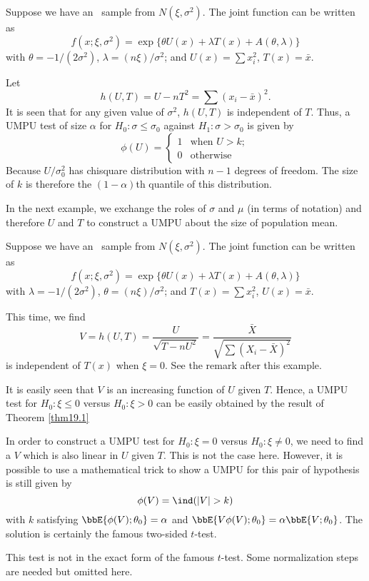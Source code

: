 \begin{example}
Suppose we have an \iid\ sample from $N(\xi, \sigma^2)$.
The joint function can be written as
\[
f(x; \xi, \sigma^2) = 
\exp\{ \theta U(x) + \lambda T(x) + A(\theta, \lambda) \}
\]
with $\theta = - 1/(2 \sigma^2)$, $\lambda = (n\xi)/\sigma^2$;
and
$U(x)  = \sum x_i^2$, $T(x) = \bar x$.

Let 
\[
h(U, T) = U - n T^2 = \sum (x_i - \bar x)^2.
\]
It is seen that for any given value of $\sigma^2$,
$h(U, T)$ is independent of $T$. 
Thus, a UMPU  test  of size $\alpha$ for $H_0: \sigma \leq \sigma_0$
against  $H_1: \sigma > \sigma_0$ is
given by
\[
\phi(U) =
\left \{
\begin{array}{ll}
1 &  \mbox{when  }  U > k;
\\
0 & \mbox{otherwise}
\end{array}
\right .
\]
Because $U/\sigma_0^2$ has chisquare distribution
with $n-1$ degrees of freedom. The size of
$k$ is therefore the $(1-\alpha)$th quantile of this distribution.
\end{example}

In the next example, we exchange the roles of $\sigma$ and $\mu$
(in terms of notation)
and therefore $U$ and $T$ to construct a UMPU about the
size of population mean.

\begin{example}
Suppose we have an \iid\ sample from $N(\xi, \sigma^2)$.
The joint function can be written as
\[
f(x; \xi, \sigma^2) = 
\exp\{ \theta U(x) + \lambda T(x) + A(\theta, \lambda) \}
\]
with $\lambda = - 1/(2 \sigma^2)$, $\theta = (n\xi)/\sigma^2$;
and
$T(x)  = \sum x_i^2$, $U(x) = \bar x$.

This time, we find
\[
V= h(U, T) 
= \frac{U}{\sqrt{T - n U^2}} 
= \frac{\bar X}{\sqrt{\sum (X_i - \bar X)^2}}
\]
is independent of $T(x)$ when $\xi = 0$. See the remark after this example.

It is easily seen that $V$ is an increasing function of $U$ given $T$.
Hence, a UMPU test for $H_0: \xi \leq 0$ versus $H_0: \xi > 0$
can be easily obtained by the result of Theorem 
\ref{thm19.1}

In order to construct a UMPU test for $H_0: \xi = 0$ versus $H_0: \xi \neq 0$,
we need to find a $V$ which is also linear in $U$ given $T$.
This is not the case here. However, it is possible to use a mathematical
trick to show a UMPU for this pair of hypothesis is still given by
\[
\phi(V) = \ind ( |V| > k)
\]
with $k$ satisfying $\bbE\{ \phi(V); \theta_0 \} = \alpha$
and $\bbE\{V \phi(V); \theta_0 \} = \alpha \bbE\{V; \theta_0 \}$.
The solution is certainly the famous two-sided $t$-test.

This test is not in the exact form of the famous $t$-test.
Some normalization steps are needed but omitted here.
\end{example}

